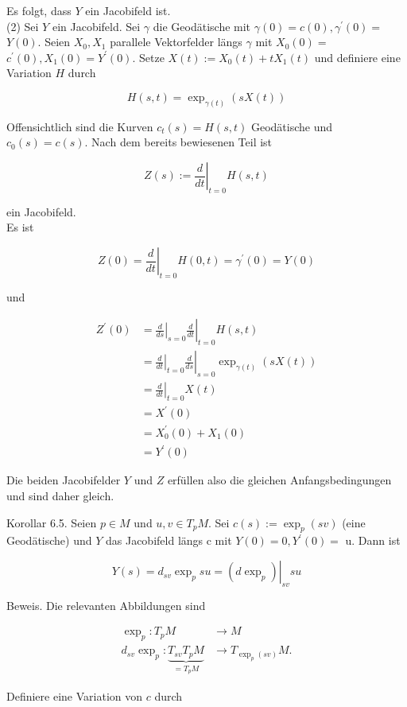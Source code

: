\documentclass[10pt]{article}
\begin{document}
Es folgt, dass $Y$ ein Jacobifeld ist.\\
(2) Sei $Y$ ein Jacobifeld. Sei $\gamma$ die Geodätische mit $\gamma(0)=c(0), \gamma^{\prime}(0)=$ $Y(0)$. Seien $X_{0}, X_{1}$ parallele Vektorfelder längs $\gamma$ mit $X_{0}(0)=$ $c^{\prime}(0), X_{1}(0)=Y^{\prime}(0)$. Setze $X(t):=X_{0}(t)+t X_{1}(t)$ und definiere eine Variation $H$ durch

$$
H(s, t)=\exp _{\gamma(t)}(s X(t))
$$

Offensichtlich sind die Kurven $c_{t}(s)=H(s, t)$ Geodätische und $c_{0}(s)=c(s)$. Nach dem bereits bewiesenen Teil ist

$$
Z(s):=\left.\frac{d}{d t}\right|_{t=0} H(s, t)
$$

ein Jacobifeld.\\
Es ist

$$
Z(0)=\left.\frac{d}{d t}\right|_{t=0} H(0, t)=\gamma^{\prime}(0)=Y(0)
$$

und

$$
\begin{aligned}
Z^{\prime}(0) & =\left.\left.\frac{d}{d s}\right|_{s=0} \frac{d}{d t}\right|_{t=0} H(s, t) \\
& =\left.\left.\frac{d}{d t}\right|_{t=0} \frac{d}{d s}\right|_{s=0} \exp _{\gamma(t)}(s X(t)) \\
& =\left.\frac{d}{d t}\right|_{t=0} X(t) \\
& =X^{\prime}(0) \\
& =X_{0}^{\prime}(0)+X_{1}(0) \\
& =Y^{\prime}(0)
\end{aligned}
$$

Die beiden Jacobifelder $Y$ und $Z$ erfüllen also die gleichen Anfangsbedingungen und sind daher gleich.

Korollar 6.5. Seien $p \in M$ und $u, v \in T_{p} M$. Sei $c(s):=\exp _{p}(s v)$ (eine Geodätische) und $Y$ das Jacobifeld längs c mit $Y(0)=0, Y^{\prime}(0)=$ u. Dann ist

$$
Y(s)=d_{s v} \exp _{p} s u=\left.\left(d \exp _{p}\right)\right|_{s v} s u
$$

Beweis. Die relevanten Abbildungen sind

$$
\begin{aligned}
\exp _{p}: T_{p} M & \rightarrow M \\
d_{s v} \exp _{p}: \underbrace{T_{s v} T_{p} M}_{=T_{p} M} & \rightarrow T_{\exp _{p}(s v)} M .
\end{aligned}
$$

Definiere eine Variation von $c$ durch
\end{document}

